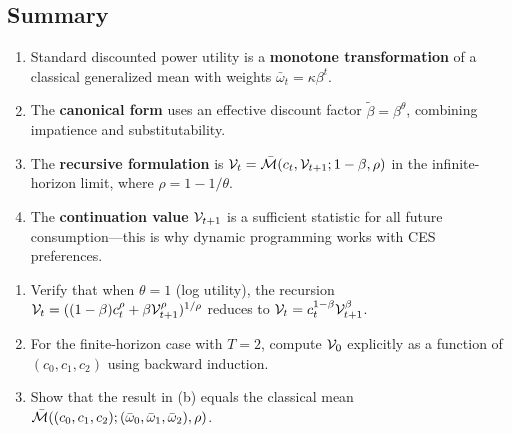 \subsection{Summary}
\label{subsec:discounted-summary}

\begin{calloutimportant}
\begin{enumerate}[label=(\roman*), leftmargin=2em]
    \item Standard discounted power utility is a \textbf{monotone transformation} of a classical generalized mean with weights $\bar{\omega}_t = \kappa \beta^t$.
    
    \item The \textbf{canonical form} uses an effective discount factor $\tilde{\beta} = \beta^\theta$, combining impatience and substitutability.
    
    \item The \textbf{recursive formulation} is $\mathcal{V}_t = \bar{\mathcal{M}}(c_t, \mathcal{V}_{t+1}; 1-\beta, \rho)$ in the infinite-horizon limit, where $\rho = 1 - 1/\theta$.
    
    \item The \textbf{continuation value} $\mathcal{V}_{t+1}$ is a sufficient statistic for all future consumption---this is why dynamic programming works with CES preferences.
\end{enumerate}
\end{calloutimportant}

\begin{callouttip}[Exercise]
\begin{enumerate}[label=(\alph*), leftmargin=1.5em]
    \item Verify that when $\theta = 1$ (log utility), the recursion $\mathcal{V}_t = ((1-\beta)c_t^\rho + \beta \mathcal{V}_{t+1}^\rho)^{1/\rho}$ reduces to $\mathcal{V}_t = c_t^{1-\beta} \mathcal{V}_{t+1}^\beta$.
    \item For the finite-horizon case with $T = 2$, compute $\mathcal{V}_0$ explicitly as a function of $(c_0, c_1, c_2)$ using backward induction.
    \item Show that the result in (b) equals the classical mean $\bar{\mathcal{M}}((c_0, c_1, c_2); (\bar{\omega}_0, \bar{\omega}_1, \bar{\omega}_2), \rho)$.
\end{enumerate}
\end{callouttip}
